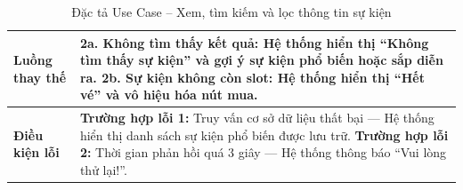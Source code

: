 \begin{table}[H]
\begin{tabularx}{\textwidth}{|l|X|}
\textbf{Luồng thay thế} &
2a. Không tìm thấy kết quả: \newline
\hspace*{1em}Hệ thống hiển thị “Không tìm thấy sự kiện” và gợi ý sự kiện phổ biến hoặc sắp diễn ra. \newline
2b. Sự kiện không còn slot: \newline
\hspace*{1em}Hệ thống hiển thị “Hết vé” và vô hiệu hóa nút mua. \\ \hline
\textbf{Điều kiện lỗi} &
\textbf{Trường hợp lỗi 1:} Truy vấn cơ sở dữ liệu thất bại — Hệ thống hiển thị danh sách sự kiện phổ biến được lưu trữ. \newline
\textbf{Trường hợp lỗi 2:} Thời gian phản hồi quá 3 giây — Hệ thống thông báo “Vui lòng thử lại!”. \\ \hline
\end{tabularx}
\vspace{15pt}
\caption{Đặc tả Use Case -- Xem, tìm kiếm và lọc thông tin sự kiện}
\label{tab:uc_search_event}
\end{table}


